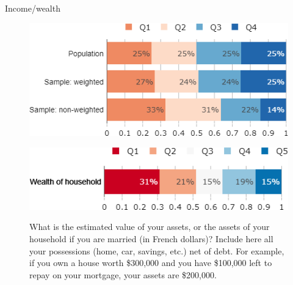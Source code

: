 \begin{framefont}{\small}
\begin{frame}{Income/wealth}%
\begin{figure}[h!]
\centering
\captionsetup{justification=centering}
\caption{What was the annual income of your household in 2019 (before withholding tax, for you and those who live with you)?}
\includegraphics[width=.43\paperwidth]{../figures/FR/income_FR_comp.png} \\
\vspace{.5cm}
\caption{\small What is the estimated value of your assets, or the assets of your household if you are married (in French dollars)? Include here all your possessions (home, car, savings, etc.) net of debt. For example, if you own a house worth \$300,000 and you have \$100,000 left to repay on your mortgage, your assets are \$200,000.}
\includegraphics[width=.43\paperwidth]{../figures/FR/wealth_FR.png} \\
\end{figure}
\end{frame}


\end{framefont}
